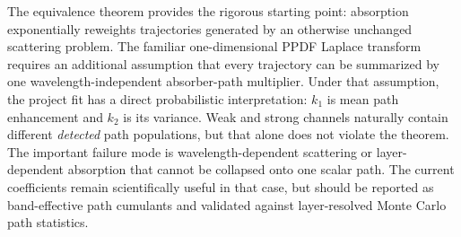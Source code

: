 \documentclass[11pt]{article}
\begin{document}
The equivalence theorem provides the rigorous starting point: absorption
exponentially reweights trajectories generated by an otherwise unchanged
scattering problem.  The familiar one-dimensional PPDF Laplace transform
requires an additional assumption that every trajectory can be summarized by
one wavelength-independent absorber-path multiplier.  Under that assumption,
the project fit has a direct probabilistic interpretation: $k_1$ is mean path
enhancement and $k_2$ is its variance.  Weak and strong channels naturally
contain different \emph{detected} path populations, but that alone does not
violate the theorem.  The important failure mode is wavelength-dependent
scattering or layer-dependent absorption that cannot be collapsed onto one
scalar path.  The current coefficients remain scientifically useful in that
case, but should be reported as band-effective path cumulants and validated
against layer-resolved Monte Carlo path statistics.



\end{document}
